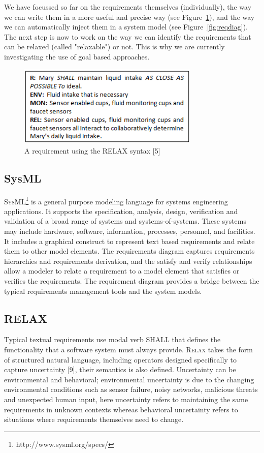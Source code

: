 \documentclass[10pt, conference, compsocconf]{IEEEtran}
\def\myrelax{\textsc{Relax}}                  %
\def\sysml{\textsc{SysML}}
\newcommand{\Myfig}[1]{Figure~\ref{fig:#1}}
\begin{document}
We have focussed so far on the requirements themselves (individually), the way we can write them in a more useful and precise way (see \Myfig{relaxreq}), and the way we can automatically inject them in a system model (see \Myfig{reqdiag}).
The next step is now to work on the way we can identify the requirements that can be relaxed (called "relaxable") or not.
This is why we are currently investigating the use of goal based approaches.

\begin{figure}[!t]
\centering
\includegraphics[width=3.4in]{fig15}
\caption{A requirement using the RELAX syntax [5]}
\label{fig:relaxreq}
\end{figure}

\subsection{SysML}


\sysml{}\footnote{http://www.sysml.org/specs/} is a general purpose modeling language for systems engineering applications. It supports the specification, analysis, design, verification and validation of a broad range of systems and systems-of-systems. These systems may include hardware, software, information, processes, personnel, and facilities. It includes a graphical construct to represent text based requirements and relate them to other model elements. The requirements diagram captures requirements hierarchies and requirements derivation, and the satisfy and verify relationships allow a modeler to relate a requirement to a model element that satisfies or verifies the requirements. The requirement diagram provides a bridge between the typical requirements management tools and the system models.

\subsection{RELAX}

Typical textual requirements use modal verb SHALL that defines the functionality that a software system must always provide. \myrelax{} takes the form of structured natural language, including operators designed specifically to capture uncertainty [9], their semantics is also defined. Uncertainty can be environmental and behavioral; environmental uncertainty is due to the changing environmental conditions such as sensor failure, noisy networks, malicious threats and unexpected human input, here uncertainty refers to maintaining the same requirements in unknown contexts whereas behavioral uncertainty refers to situations where requirements themselves need to change.
\end{document}

